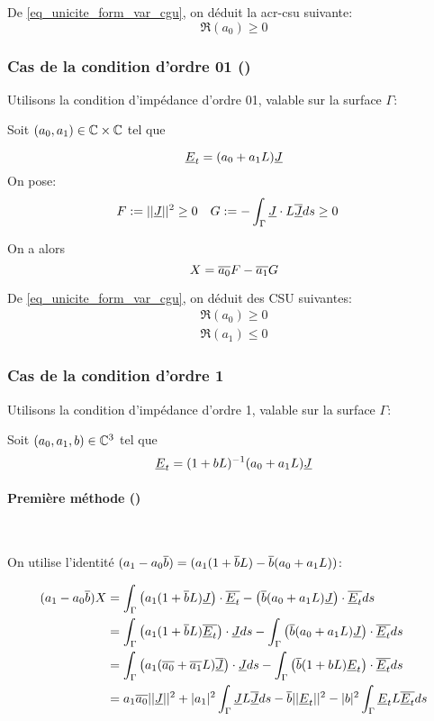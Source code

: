 De \eqref{eq_unicite_form_var_cgu}, on déduit la \gls{acr-csu} suivante:
\begin{equation}
\Re\left(a_0\right) \ge 0
\end{equation}

\subsubsection{Cas de la condition d'ordre 01 (\cite{stupfel_sufficient_2011})}
Utilisons la condition d’impédance d'ordre 01, valable sur la surface $\Gamma$:

Soit $(a_0, a_1) \in \mathbb C\times\mathbb C$ tel que

\[
\underline{E}_t = (a_0 +a_1L)\underline{J}
\]
On pose:
\begin{align*}
F&:= || \underline{J}|| ^2 \ge 0  & G&:= -\int_\Gamma \underline{J}\cdot L{\overline{\underline{J}}} ds \ge 0
\end{align*}

On a alors
\begin{equation*}
X = {\overline{a_0}}F - {\overline{a_1}}G
\end{equation*}

De \eqref{eq_unicite_form_var_cgu}, on déduit des CSU suivantes:
\begin{align}
\Re\left(a_0\right) \ge 0\\
\Re\left(a_1\right) \le 0
\end{align}
\subsubsection{Cas de la condition d'ordre 1}


Utilisons la condition d’impédance d'ordre 1, valable sur la surface $\Gamma$: 

Soit $(a_0, a_1,b) \in \mathbb C^3$ tel que
\[
\underline{E}_t = (1 + b L)^{-1} (a_0 + a_1 L) \underline{J}
\]

\paragraph{Première méthode (\cite{stupfel_sufficient_2011})}~

On utilise l'identité $(a_1-a_0{\overline{b}}) = (a_1(1+{\overline{b}}L) - {\overline{b}}(a_0+a_1L))$:

\begin{align*}
(a_1-a_0{\overline{b}})X &= \int_\Gamma \left(a_1(1+{\overline{b}}L) \underline{J}\right)\cdot{\overline{\underline{E}_t}} - \left({\overline{b}}(a_0+a_1L)\underline{J}\right)\cdot{\overline{\underline{E}_t}} ds\\
&= \int_\Gamma \left(a_1(1+{\overline{b}}L) {\overline{\underline{E}_t}}\right)\cdot\underline{J} ds - \int_\Gamma \left({\overline{b}}(a_0+a_1L)\underline{J}\right)\cdot{\overline{\underline{E}_t}} ds\\
&= \int_\Gamma \left(a_1({\overline{a_0}}+{\overline{a_1}}L) {\overline{\underline{J}}}\right)\cdot\underline{J} ds  - \int_\Gamma \left({\overline{b}}(1+bL)\underline{E}_t\right)\cdot{\overline{\underline{E}_t}} ds\\
&= a_1{\overline{a_0}} ||\underline{J}||^2 + |a_1|^2 \int_\Gamma \underline{J} L {\overline{\underline{J}}} ds - {\overline{b}} ||\underline{E}_t||^2 - |b|^2 \int_\Gamma \underline{E}_t L {\overline{\underline{E}_t}} ds
\end{align*}

